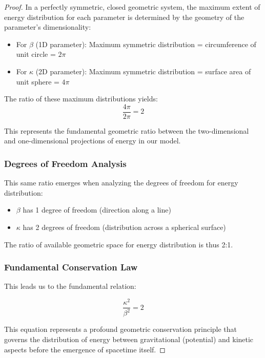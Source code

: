 \documentclass{article}
\begin{document}
\begin{proof}
In a perfectly symmetric, closed geometric system, the maximum extent of energy distribution for each parameter is determined by the geometry of the parameter's dimensionality:

\begin{itemize}
    \item For $\beta$ (1D parameter): Maximum symmetric distribution = circumference of unit circle = $2\pi$
    \item For $\kappa$ (2D parameter): Maximum symmetric distribution = surface area of unit sphere = $4\pi$
\end{itemize}

The ratio of these maximum distributions yields:
\begin{equation}
\frac{4\pi}{2\pi} = 2
\end{equation}

This represents the fundamental geometric ratio between the two-dimensional and one-dimensional projections of energy in our model.

\subsubsection{Degrees of Freedom Analysis}

This same ratio emerges when analyzing the degrees of freedom for energy distribution:
\begin{itemize}
    \item $\beta$ has 1 degree of freedom (direction along a line)
    \item $\kappa$ has 2 degrees of freedom (distribution across a spherical surface)
\end{itemize}

The ratio of available geometric space for energy distribution is thus 2:1.

\subsubsection{Fundamental Conservation Law}

This leads us to the fundamental relation:

\begin{equation}
\boxed{\frac{\kappa^2}{\beta^2} = 2}
\end{equation}

This equation represents a profound geometric conservation principle that governs the distribution of energy between gravitational (potential) and kinetic aspects before the emergence of spacetime itself.


\end{proof}
\end{document}
